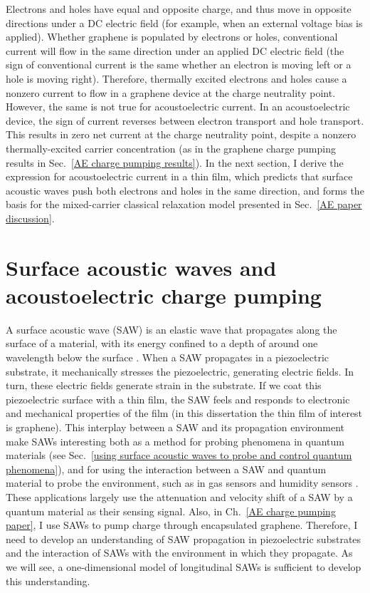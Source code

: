 \documentclass[double,12pt,1in,seploa]{beavtex}
\let\Oldsection\section
\renewcommand{\section}{\FloatBarrier\Oldsection}
\begin{document}
Electrons and holes have equal and opposite charge, and thus move in opposite directions under a DC electric field (for example, when an external voltage bias is applied). Whether graphene is populated by electrons or holes, conventional current will flow in the same direction under an applied DC electric field (the sign of conventional current is the same whether an electron is moving left or a hole is moving right). Therefore, thermally excited electrons and holes cause a nonzero current to flow in a graphene device at the charge neutrality point. However, the same is not true for acoustoelectric current. In an acoustoelectric device, the sign of current reverses between electron transport and hole transport. This results in zero net current at the charge neutrality point, despite a nonzero thermally-excited carrier concentration (as in the graphene charge pumping results in Sec.\ \ref{AE charge pumping results}). In the next section, I derive the expression for acoustoelectric current in a thin film, which predicts that surface acoustic waves push both electrons and holes in the same direction, and forms the basis for the mixed-carrier classical relaxation model presented in Sec.\ \ref{AE paper discussion}.

\section{Surface acoustic waves and acoustoelectric charge pumping}

A surface acoustic wave (SAW) is an elastic wave that propagates along the surface of a material, with its energy confined to a depth of around one wavelength below the surface \cite{rayleigh_waves_1885}. When a SAW propagates in a piezoelectric substrate, it mechanically stresses the piezoelectric, generating electric fields. In turn, these electric fields generate strain in the substrate. If we coat this piezoelectric surface with a thin film, the SAW feels and responds to electronic and mechanical properties of the film (in this dissertation the thin film of interest is graphene). This interplay between a SAW and its propagation environment make SAWs interesting both as a method for probing phenomena in quantum materials (see Sec.\ \ref{using surface acoustic waves to probe and control quantum phenomena}), and for using the interaction between a SAW and quantum material to probe the environment, such as in gas sensors and humidity sensors \cite{yang_gas_2017}. These applications largely use the attenuation and velocity shift of a SAW by a quantum material as their sensing signal. Also, in Ch.\ \ref{AE charge pumping paper}, I use SAWs to pump charge through encapsulated graphene. Therefore, I need to develop an understanding of SAW propagation in piezoelectric substrates and the interaction of SAWs with the environment in which they propagate. As we will see, a one-dimensional model of longitudinal SAWs is sufficient to develop this understanding. 
\end{document}
